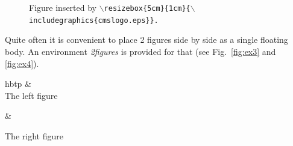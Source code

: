 \documentclass{cmspaper}
\begin{document}
\begin{figure}[hbtp]
  \begin{center}
    \caption{Figure inserted by 
       \tt $\backslash$resizebox\{5cm\}\{1cm\}\{$\backslash$includegraphics\{cmslogo.eps\}\}.}
    \label{fig:ex2}
  \end{center}
\end{figure}

Quite often it is convenient to place 2 figures side by side as a single
floating body. An environment {\em 2figures} is provided for that
(see Fig.~\ref{fig:ex3} and \ref{fig:ex4}).

\begin{2figures}{hbtp}
   &
   \\
  \caption{The left figure}
  \label{fig:ex3} &
  \caption{The right figure}
  \label{fig:ex4} \\
\end{2figures}
\end{document}
